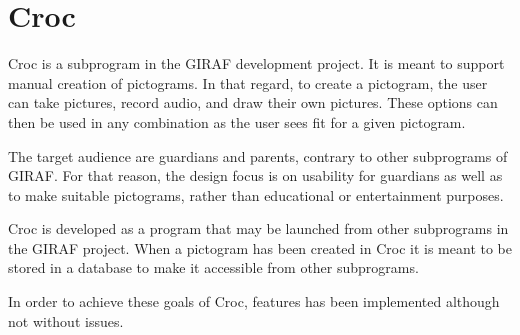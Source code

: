 \section{Croc}
Croc is a subprogram in the GIRAF development project. 
It is meant to support manual creation of pictograms.
In that regard, to create a pictogram, the user can take pictures, record audio, and draw their own pictures.
These options can then be used in any combination as the user sees fit for a given pictogram.

The target audience are guardians and parents, contrary to other subprograms of GIRAF. 
For that reason, the design focus is on usability for guardians as well as to make suitable pictograms, rather than educational or entertainment purposes.

Croc is developed as a program that may be launched from other subprograms in the GIRAF project.
When a pictogram has been created in Croc it is meant to be stored in a database to make it accessible from other subprograms.

In order to achieve these goals of Croc, features has been implemented although not without issues.

